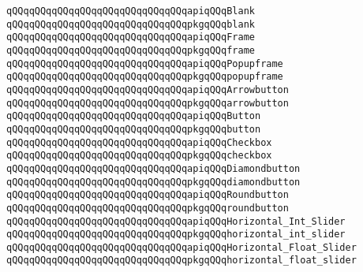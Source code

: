 \newline
\verb|qQQqqQQqqQQqqQQqqQQqqQQqqQQqqQQqapiqQQqBlank|\newline
\verb|qQQqqQQqqQQqqQQqqQQqqQQqqQQqqQQqpkgqQQqblank|\newline
\newline
\verb|qQQqqQQqqQQqqQQqqQQqqQQqqQQqqQQqapiqQQqFrame|\newline
\verb|qQQqqQQqqQQqqQQqqQQqqQQqqQQqqQQqpkgqQQqframe|\newline
\newline
\verb|qQQqqQQqqQQqqQQqqQQqqQQqqQQqqQQqapiqQQqPopupframe|\newline
\verb|qQQqqQQqqQQqqQQqqQQqqQQqqQQqqQQqpkgqQQqpopupframe|\newline
\newline
\verb|qQQqqQQqqQQqqQQqqQQqqQQqqQQqqQQqapiqQQqArrowbutton|\newline
\verb|qQQqqQQqqQQqqQQqqQQqqQQqqQQqqQQqpkgqQQqarrowbutton|\newline
\newline
\verb|qQQqqQQqqQQqqQQqqQQqqQQqqQQqqQQqapiqQQqButton|\newline
\verb|qQQqqQQqqQQqqQQqqQQqqQQqqQQqqQQqpkgqQQqbutton|\newline
\newline
\verb|qQQqqQQqqQQqqQQqqQQqqQQqqQQqqQQqapiqQQqCheckbox|\newline
\verb|qQQqqQQqqQQqqQQqqQQqqQQqqQQqqQQqpkgqQQqcheckbox|\newline
\newline
\verb|qQQqqQQqqQQqqQQqqQQqqQQqqQQqqQQqapiqQQqDiamondbutton|\newline
\verb|qQQqqQQqqQQqqQQqqQQqqQQqqQQqqQQqpkgqQQqdiamondbutton|\newline
\newline
\verb|qQQqqQQqqQQqqQQqqQQqqQQqqQQqqQQqapiqQQqRoundbutton|\newline
\verb|qQQqqQQqqQQqqQQqqQQqqQQqqQQqqQQqpkgqQQqroundbutton|\newline
\newline
\verb|qQQqqQQqqQQqqQQqqQQqqQQqqQQqqQQqapiqQQqHorizontal_Int_Slider|\newline
\verb|qQQqqQQqqQQqqQQqqQQqqQQqqQQqqQQqpkgqQQqhorizontal_int_slider|\newline
\newline
\verb|qQQqqQQqqQQqqQQqqQQqqQQqqQQqqQQqapiqQQqHorizontal_Float_Slider|\newline
\verb|qQQqqQQqqQQqqQQqqQQqqQQqqQQqqQQqpkgqQQqhorizontal_float_slider|\newline
